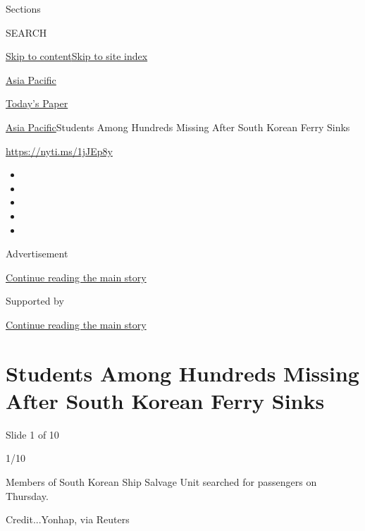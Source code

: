 Sections

SEARCH

\protect\hyperlink{site-content}{Skip to
content}\protect\hyperlink{site-index}{Skip to site index}

\href{https://www.nytimes3xbfgragh.onion/section/world/asia}{Asia
Pacific}

\href{https://myaccount.nytimes3xbfgragh.onion/auth/login?response_type=cookie\&client_id=vi}{}

\href{https://www.nytimes3xbfgragh.onion/section/todayspaper}{Today's
Paper}

\href{/section/world/asia}{Asia Pacific}\textbar{}Students Among
Hundreds Missing After South Korean Ferry Sinks

\url{https://nyti.ms/1jJEp8y}

\begin{itemize}
\item
\item
\item
\item
\item
\end{itemize}

Advertisement

\protect\hyperlink{after-top}{Continue reading the main story}

Supported by

\protect\hyperlink{after-sponsor}{Continue reading the main story}

\hypertarget{students-among-hundreds-missing-after-south-korean-ferry-sinks}{%
\section{Students Among Hundreds Missing After South Korean Ferry
Sinks}\label{students-among-hundreds-missing-after-south-korean-ferry-sinks}}

Slide 1 of 10

1/10

Members of South Korean Ship Salvage Unit searched for passengers on
Thursday.

Credit...Yonhap, via Reuters

